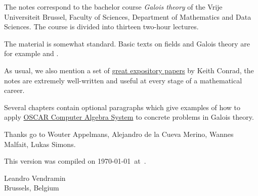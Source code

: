 \preface

The notes correspond to the bachelor 
course \emph{Galois theory} of the 
Vrije Universiteit Brussel, 
Faculty of Sciences, 
Department of Mathematics and Data Sciences. The course
is divided into thirteen two-hour lectures. 

The material is somewhat standard. Basic texts on fields and Galois theory 
are for example \cite{MR1645586} and 
\cite{MR3379917}. 

As usual, we also mention a set of 
\href{https://kconrad.math.uconn.edu/blurbs/}{great expository papers} by 
Keith Conrad, the notes are extremely well-written and useful  
at every stage of a mathematical career. 

Several chapters contain optional paragraphs which give examples of 
how to apply \href{https://oscar.computeralgebra.de/}{OSCAR Computer Algebra System}
to concrete problems in Galois theory. 

 
Thanks go to Wouter Appelmans, Alejandro de la Cueva Merino, 
Wannes Malfait,
Lukas Simons. 


This version 
was compiled on \today~at~\currenttime.

\bigskip
\begin{flushright}
Leandro Vendramin\\Brussels, Belgium\par
\end{flushright}
